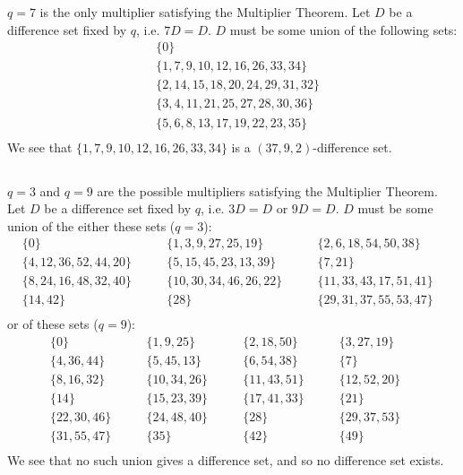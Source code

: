 \documentclass{article}
\begin{document}
\section{} %
\subsection{} %
$q=7$ is the only multiplier satisfying the Multiplier Theorem. Let $D$ be a
difference set fixed by $q$, i.e. $7D=D$. $D$ must be some union of the
following sets:
\begin{align*}
&\{0\}\\
&\{1,7,9,10,12,16,26,33,34\}\\
&\{2,14,15,18,20,24,29,31,32\}\\
&\{3,4,11,21,25,27,28,30,36\}\\
&\{5,6,8,13,17,19,22,23,35\}\\
\end{align*}
We see that $\{1,7,9,10,12,16,26,33,34\}$ is a $(37,9,2)$-difference set.
\subsection{} %
$q=3$ and $q=9$ are the possible multipliers satisfying the Multiplier Theorem.
Let $D$ be a difference set fixed by $q$, i.e. $3D=D$ or $9D=D$. $D$ must be
some union of the either these sets ($q=3$):
\begin{align*}
&\{0\}\qquad&\{1,3,9,27,25,19\}\qquad&\{2,6,18,54,50,38\}\qquad\\
&\{4,12,36,52,44,20\}\qquad&\{5,15,45,23,13,39\}\qquad&\{7,21\}\qquad\\
&\{8,24,16,48,32,40\}\qquad&\{10,30,34,46,26,22\}\qquad&\{11,33,43,17,51,41\}\qquad\\
&\{14,42\}\qquad&\{28\}\qquad&\{29,31,37,55,53,47\}\qquad\\
\end{align*}
or of these sets ($q=9$):
\begin{align*}
&\{0\}\qquad&\{1,9,25\}\qquad&\{2,18,50\}\qquad&\{3,27,19\}\qquad\\
&\{4,36,44\}\qquad&\{5,45,13\}\qquad&\{6,54,38\}\qquad&\{7\}\qquad\\
&\{8,16,32\}\qquad&\{10,34,26\}\qquad&\{11,43,51\}\qquad&\{12,52,20\}\qquad\\
&\{14\}\qquad&\{15,23,39\}\qquad&\{17,41,33\}\qquad&\{21\}\qquad\\
&\{22,30,46\}\qquad&\{24,48,40\}\qquad&\{28\}\qquad&\{29,37,53\}\qquad\\
&\{31,55,47\}\qquad&\{35\}\qquad&\{42\}\qquad&\{49\}\qquad\\
\end{align*}
We see that no such union gives a difference set, and so no difference set exists.
\end{document}
